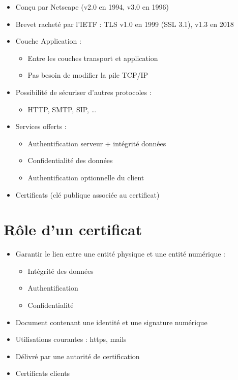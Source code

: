 \begin{itemize}
\tightlist
\item
  Conçu par Netscape (v2.0 en 1994, v3.0 en 1996)
\item
  Brevet racheté par l'IETF : TLS v1.0 en 1999 (SSL 3.1), v1.3 en 2018
\item
  Couche Application :

  \begin{itemize}
  \tightlist
  \item
    Entre les couches transport et application
  \item
    Pas besoin de modifier la pile TCP/IP
  \end{itemize}
\item
  Possibilité de sécuriser d'autres protocoles :

  \begin{itemize}
  \tightlist
  \item
    HTTP, SMTP, SIP, \ldots{}
  \end{itemize}
\item
  Services offerts :

  \begin{itemize}
  \tightlist
  \item
    Authentification serveur + intégrité données
  \item
    Confidentialité des données
  \item
    Authentification optionnelle du client
  \end{itemize}
\item
  Certificats (clé publique associée au certificat)
\end{itemize}

\hypertarget{ruxf4le-dun-certificat}{%
\section{Rôle d'un certificat}\label{ruxf4le-dun-certificat}}

\begin{itemize}
\tightlist
\item
  Garantir le lien entre une entité physique et une entité numérique :

  \begin{itemize}
  \tightlist
  \item
    Intégrité des données
  \item
    Authentification
  \item
    Confidentialité
  \end{itemize}
\item
  Document contenant une identité et une signature numérique
\item
  Utilisations courantes : https, mails
\item
  Délivré par une autorité de certification
\item
  Certificats clients
\end{itemize}

